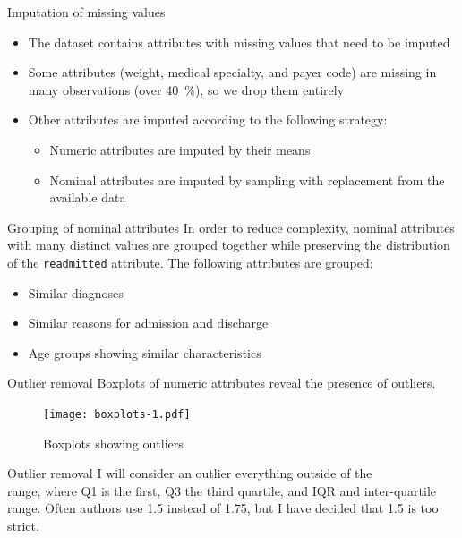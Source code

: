 \documentclass[serif, hyperref={unicode}, xcolor={x11names, psnames, dvipsnames,
  table}, usepdftitle=false]{beamer}
\begin{document}
\begin{frame}{Imputation of missing values}
  \begin{itemize}
  \item The dataset contains attributes with missing values that need to be
    imputed
  \item Some attributes (weight, medical specialty, and payer code) are missing
    in many observations (over \SI{40}{\percent}), so we drop them entirely
  \item Other attributes are imputed according to the following strategy:
    \begin{itemize}
    \item Numeric attributes are imputed by their means
    \item Nominal attributes are imputed by sampling with replacement from the
      available data
    \end{itemize}
  \end{itemize}
\end{frame}

\begin{frame}{Grouping of nominal attributes}
  In order to reduce complexity, nominal attributes with many distinct values
  are grouped together while preserving the distribution of the
  \texttt{readmitted} attribute.  The following attributes are grouped:
  \begin{itemize}
  \item Similar diagnoses
  \item Similar reasons for admission and discharge
  \item Age groups showing similar characteristics
  \end{itemize}
\end{frame}

\begin{frame}{Outlier removal}
  Boxplots of numeric attributes reveal the presence of outliers.
  \begin{figure}[!h]
    \texttt{[image: boxplots-1.pdf]}
    \caption{Boxplots showing outliers}
  \end{figure}
\end{frame}

\begin{frame}{Outlier removal}
  I will consider an outlier everything outside of the
  \begin{equation}
    [\mathrm{Q1} - 1.75 \cdot \mathrm{IQR}, \mathrm{Q3} + 1.75 \cdot
    \mathrm{IQR}]
  \end{equation}
  range, where Q1 is the first, Q3 the third quartile, and IQR and
  inter-quartile range.  Often authors use \num{1.5} instead of \num{1.75}, but
  I have decided that \num{1.5} is too strict.
\end{frame}
\end{document}
